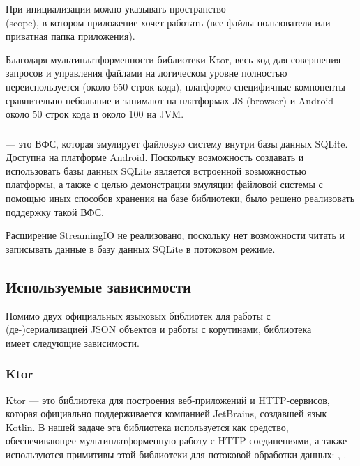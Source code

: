     При инициализации  можно указывать пространство\\ (scope), в котором приложение хочет работать (все файлы пользователя или приватная папка приложения).

    Благодаря мультиплатформенности библиотеки Ktor, весь код для совершения запросов и управления файлами на логическом уровне полностью переиспользуется (около 650 строк кода), платформо-специфичные компоненты сравнительно небольшие и занимают на платформах JS (browser) и Android около 50 строк кода и около 100 на JVM.
  \subsubsection{}
     --- это ВФС, которая эмулирует файловую систему внутри базы данных SQLite. Доступна на платформе Android. Поскольку возможность создавать и использовать базы данных SQLite является встроенной возможностью платформы, а также с целью демонстрации эмуляции файловой системы с помощью иных способов хранения на базе библиотеки, было решено реализовать поддержку такой ВФС. 

    Расширение StreamingIO не реализовано, поскольку нет возможности читать и записывать данные в базу данных SQLite в потоковом режиме.
    


\subsection{Используемые зависимости}
  Помимо двух официальных языковых библиотек для работы с\\ (де-)сериализацией JSON объектов и работы с корутинами, библиотека\\  имеет следующие зависимости.
  \subsubsection{Ktor}\label{dependencies-ktor}
    Ktor\cite{ktor} --- это библиотека для построения веб-приложений и HTTP-сервисов, которая официально поддерживается компанией JetBrains, создавшей язык Kotlin. В нашей задаче эта библиотека используется как средство, обеспечивающее мультиплатформенную работу с HTTP-соединениями, а также используются примитивы этой библиотеки для потоковой обработки данных: , .

